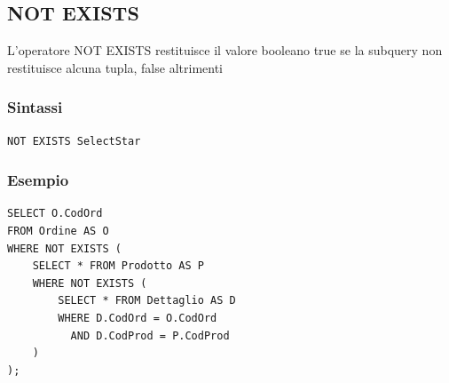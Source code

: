 \subsection{NOT EXISTS}
L'operatore NOT EXISTS restituisce il valore booleano true se la subquery non restituisce alcuna tupla, false altrimenti

\subsubsection{Sintassi}
\begin{lstlisting}[language=sql_generic]
NOT EXISTS SelectStar
\end{lstlisting}

\subsubsection{Esempio}
\begin{lstlisting}[language=sql_generic]
SELECT O.CodOrd
FROM Ordine AS O
WHERE NOT EXISTS (
    SELECT * FROM Prodotto AS P
    WHERE NOT EXISTS (
        SELECT * FROM Dettaglio AS D
        WHERE D.CodOrd = O.CodOrd 
          AND D.CodProd = P.CodProd
    )
);
\end{lstlisting}